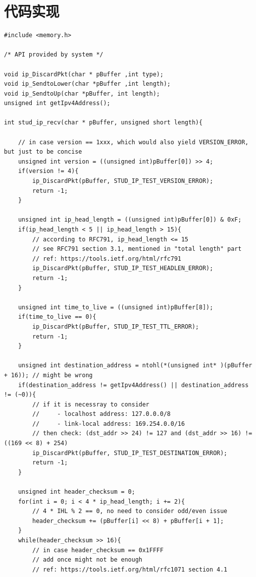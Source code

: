 \documentclass{article}
\begin{document}
\section{代码实现}



\lstset{breaklines}
\lstset{extendedchars=false}

\begin{lstlisting}
#include <memory.h>

/* API provided by system */

void ip_DiscardPkt(char * pBuffer ,int type);
void ip_SendtoLower(char *pBuffer ,int length);
void ip_SendtoUp(char *pBuffer, int length);
unsigned int getIpv4Address();

int stud_ip_recv(char * pBuffer, unsigned short length){

    // in case version == 1xxx, which would also yield VERSION_ERROR, but just to be concise
    unsigned int version = ((unsigned int)pBuffer[0]) >> 4;
    if(version != 4){
        ip_DiscardPkt(pBuffer, STUD_IP_TEST_VERSION_ERROR);
        return -1;
    }

    unsigned int ip_head_length = ((unsigned int)pBuffer[0]) & 0xF;
    if(ip_head_length < 5 || ip_head_length > 15){
        // according to RFC791, ip_head_length <= 15
        // see RFC791 section 3.1, mentioned in "total length" part
        // ref: https://tools.ietf.org/html/rfc791
        ip_DiscardPkt(pBuffer, STUD_IP_TEST_HEADLEN_ERROR);
        return -1;
    }

    unsigned int time_to_live = ((unsigned int)pBuffer[8]);
    if(time_to_live == 0){
        ip_DiscardPkt(pBuffer, STUD_IP_TEST_TTL_ERROR);
        return -1;
    }

    unsigned int destination_address = ntohl(*(unsigned int* )(pBuffer + 16)); // might be wrong
    if(destination_address != getIpv4Address() || destination_address != (~0)){
        // if it is necessray to consider
        //     - localhost address: 127.0.0.0/8
        //     - link-local address: 169.254.0.0/16
        // then check: (dst_addr >> 24) != 127 and (dst_addr >> 16) != ((169 << 8) + 254)
        ip_DiscardPkt(pBuffer, STUD_IP_TEST_DESTINATION_ERROR);
        return -1;
    }

    unsigned int header_checksum = 0;
    for(int i = 0; i < 4 * ip_head_length; i += 2){
        // 4 * IHL % 2 == 0, no need to consider odd/even issue
        header_checksum += (pBuffer[i] << 8) + pBuffer[i + 1];
    }
    while(header_checksum >> 16){
        // in case header_checksum == 0x1FFFF
        // add once might not be enough
        // ref: https://tools.ietf.org/html/rfc1071 section 4.1


\end{lstlisting}
\end{document}
